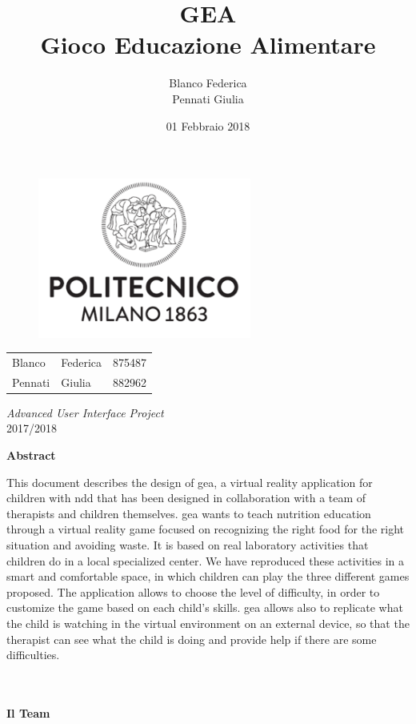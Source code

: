 \documentclass[a4paper, 12pt]{article}
\title{\textbf{GEA}\\[3mm]
Gioco Educazione Alimentare}
\author{Blanco Federica\\Pennati Giulia}
\date{01 Febbraio 2018}
\makeatletter
\renewcommand{\maketitle}{ 
\begin{figure}[h]
\centering
\includegraphics[width=7cm]{Images/LogoPolimi}\\[.5cm]
\end{figure}

\vspace{50pt}

\begin{flushright} 
\@date 

{\huge\@title} 
\vspace{140pt} 


\begin{tabular}{ l l c}
\large Blanco &  \large Federica & \large 875487\\
\large Pennati & \large Giulia & \large 882962\\
\end{tabular}

\vspace{40pt} 
\end{flushright}
\centering
\textsl{\large Advanced User Interface Project}\\
2017/2018
}
\makeatother
\begin{document}
\begin{titlepage}

\thispagestyle{empty}
\maketitle 

\end{titlepage}

\clearpage
\begin{center}
\textbf{Abstract}\\
\end{center}
This document describes the design of \acs{gea}, a virtual reality application for children with \acl{ndd} that has been designed in collaboration with a team of therapists and children themselves. \acs{gea} wants to teach nutrition education through a virtual reality game focused on recognizing the right food for the right situation and avoiding waste. It is based on real laboratory activities that children do in a local specialized center. We have reproduced these activities in a smart and comfortable space, in which children can play the three different games proposed. The application allows to choose the level of difficulty, in order to customize the game based on each child's skills. \acs{gea} allows also to replicate what the child is watching in the virtual environment on an external device, so that the therapist can see what the child is doing and provide help if there are some difficulties.
\\
\\
\\
\begin{center}
\textbf{Il Team}\\
\end{center}
\vspace{20px}
\end{document}
